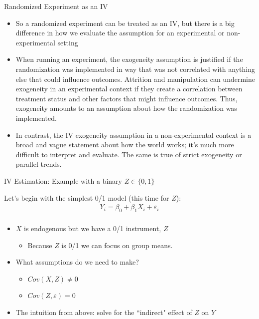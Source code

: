 \documentclass[aspectratio=169,11pt]{beamer}
\begin{document}
\begin{frame}{ Randomized Experiment as an IV}
\begin{itemize}
\item So a randomized experiment can be treated as an IV, but there is a big difference in
	how we evaluate the assumption for an experimental or non-experimental setting
\medskip
\item When running an experiment, the exogeneity assumption is justified if the
	randomization was implemented in way that was not correlated with anything else that could
	influence outcomes. Attrition and manipulation can undermine exogeneity in an experimental context
	if they create a correlation between treatment status and other factors that might influence outcomes.
	 Thus, exogeneity amounts to an assumption about how the randomization was implemented.
	\medskip
	\item In contrast, the IV exogeneity assumption in a non-experimental context is a broad and vague statement
	about how the world works; it's much more difficult to interpret and evaluate. The same is
	true of strict exogeneity or parallel trends.
\end{itemize}
\end{frame}


\begin{frame}{IV Estimation: Example with a binary $Z \in\{0,1\}$}

Let's begin with the simplest 0/1 model (this time for $Z$):
\begin{align*}
	Y_i = \beta_0 + \beta_1 X_i + \varepsilon_i\\
\end{align*}

\begin{itemize}
	\item  $X$ is endogenous but we have a 0/1 instrument, $Z$
	\begin{itemize}
		\item Because $Z$ is 0/1 we can focus on group means.
	\end{itemize}

	\item What assumptions do we need to make?
		\begin{itemize}
			\item $Cov(X,Z)\ne 0$
			\item $Cov(Z,\varepsilon) = 0$
		\end{itemize}
	\item The intuition from above: solve for the ``indirect" effect of $Z$ on $Y$
\end{itemize}

\end{frame}
\end{document}

